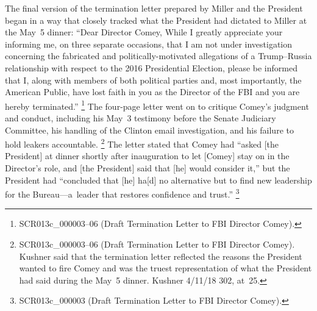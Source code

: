 The final version of the termination letter prepared by Miller and the President began in a way that closely tracked what the President had dictated to Miller at the May~5 dinner:
``Dear Director Comey, While I greatly appreciate your informing me, on three separate occasions, that I am not under investigation concerning the fabricated and politically-motivated allegations of a Trump--Russia relationship with respect to the 2016 Presidential Election, please be informed that I, along with members of both political parties and, most importantly, the American Public, have lost faith in you as the Director of the FBI and you are hereby terminated.''%
\footnote{SCR013c\_000003--06 (Draft Termination Letter to FBI Director Comey).}
The four-page letter went on to critique Comey's judgment and conduct, including his May~3 testimony before the Senate Judiciary Committee, his handling of the Clinton email investigation, and his failure to hold leakers accountable.%
\footnote{SCR013c\_000003--06 (Draft Termination Letter to FBI Director Comey).
Kushner said that the termination letter reflected the reasons the President wanted to fire Comey and was the truest representation of what the President had said during the May~5 dinner.
Kushner 4/11/18 302, at~25.}
The letter stated that Comey had ``asked [the President] at dinner shortly after inauguration to let [Comey] stay on in the Director's role, and [the President] said that [he] would consider it,'' but the President had ``concluded that [he] ha[d] no alternative but to find new leadership for the Bureau---a~leader that restores confidence and trust.''%
\footnote{SCR013c\_000003 (Draft Termination Letter to FBI Director Comey).}

